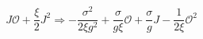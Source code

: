 \begin{equation}
J\mathcal{O}+\frac{\xi }{2}J^{2}\Rightarrow -\frac{\sigma ^{2}}{2\xi g^{2}}+%
\frac{\sigma }{g\xi}\mathcal{O}+\frac{\sigma }{g}J-\frac{1}{2\xi }\mathcal{O}%
^{2}  \label{hs}
\end{equation}

